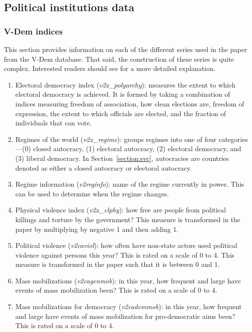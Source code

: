 \documentclass[12pt]{article}
\numberwithin{equation}{section}
\begin{document}
\subsection{Political institutions data}

\subsubsection{V-Dem indices}\label{section:vdem_ind}

This section provides information on each of the different series used in the paper from the V-Dem database. That said, the construction of these series is quite complex. Interested readers should see \cite{Coppedge2018} for a more detailed explanation.

\begin{enumerate}
	\item Electoral democracy index (\textit{v2x\_polyarchy}): measures the extent to which electoral democracy is achieved. It is formed by taking a combination of indices measuring freedom of association, how clean elections are, freedom of expression, the extent to which officials are elected, and
the fraction of individuals that can vote.
	\item Regimes of the world (\textit{v2x\_regime}): groups regimes into one of four categories---(0) closed autocracy, (1) electoral autocracy, (2) electoral democracy,  and (3) liberal democracy. In Section~\ref{section:svc}, autocracies are countries denoted as either a closed autocracy or electoral autocracy.
	\item Regime information (\textit{v2reginfo}): name of the regime currently in power. This can be used to determine when the regime changes.
	\item Physical violence index (\textit{v2x\_clphy}): how free are people from political killings and torture by the government? This measure is transformed in the paper by multiplying by negative 1 and then adding 1.
	\item Political violence (\textit{v2caviol}): how often have non-state actors used political violence against persons this year? This is rated on a scale of 0 to 4. This measure is transformed in the paper such that it is between 0 and 1.
	\item Mass mobilizations (\textit{v2cagenmob}): in this year, how frequent and large have events of mass mobilization been?  This is rated on a scale of 0 to 4.
	\item Mass mobilizations for democracy (\textit{v2cademmob}): in this year, how frequent and large have events of mass mobilization for pro-democratic aims been?  This is rated on a scale of 0 to 4.

\end{enumerate}
\end{document}
